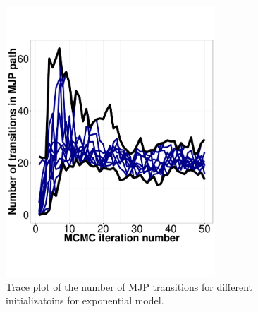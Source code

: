   
  
  \begin{figure}%
  \centering
  \begin{minipage}[hp]{0.45\linewidth}
  \centering
    \includegraphics [width=0.70\textwidth, angle=0]{figs/exp3_k2_path_transition.pdf}
    \caption{Trace plot of the number of MJP transitions for different initializatoins for exponential model.}
      \end{minipage}
  \end{figure}

